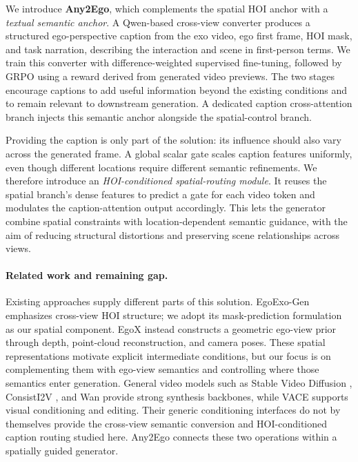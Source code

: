 \documentclass{article} %
\begin{document}
We introduce \textbf{Any2Ego}, which complements the spatial HOI anchor
with a \emph{textual semantic anchor}. A Qwen-based cross-view converter
produces a structured ego-perspective caption from the exo video, ego first
frame, HOI mask, and task narration, describing the interaction and scene
in first-person terms. We train this converter with difference-weighted supervised
fine-tuning, followed by GRPO \citep{shao2024grpo} using a reward derived
from generated video previews. The two stages encourage captions to add
useful information beyond the existing conditions and to remain relevant
to downstream generation. A dedicated caption cross-attention branch
injects this semantic anchor alongside the spatial-control branch.

Providing the caption is only part of the solution: its influence should
also vary across the generated frame. A global scalar gate scales caption
features uniformly, even though different locations require different
semantic refinements. We therefore introduce an \emph{HOI-conditioned
spatial-routing module}. It reuses the spatial branch's dense features to
predict a gate for each video token and modulates the caption-attention
output accordingly. This lets the generator combine spatial constraints
with location-dependent semantic guidance, with the aim of reducing
structural distortions and preserving scene relationships across views.

\paragraph{Related work and remaining gap.}
\label{sec:related}
Existing approaches supply different parts of this solution.
EgoExo-Gen \citep{xu2025egoexogen} emphasizes cross-view HOI structure;
we adopt its mask-prediction formulation as our spatial component.
EgoX \citep{kang2025egox} instead constructs a geometric ego-view prior
through depth, point-cloud reconstruction, and camera poses. These spatial
representations motivate explicit intermediate conditions, but our focus is
on complementing them with ego-view semantics and controlling where those
semantics enter generation. General video models such as Stable Video
Diffusion \citep{blattmann2023svd}, ConsistI2V \citep{ren2024consisti2v},
and Wan \citep{wan2025} provide strong synthesis backbones, while VACE
\citep{vace2025} supports visual conditioning and editing. Their generic
conditioning interfaces do not by themselves provide the cross-view
semantic conversion and HOI-conditioned caption routing studied here.
Any2Ego connects these two operations within a spatially guided generator.
\end{document}
